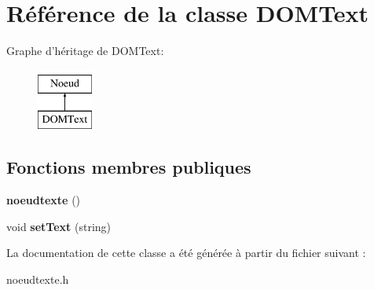 \hypertarget{classDOMText}{
\section{Référence de la classe DOMText}
\label{classDOMText}
}
Graphe d'héritage de DOMText:\begin{figure}[H]
\begin{center}
\leavevmode
\includegraphics[height=2.000000cm]{classDOMText}
\end{center}
\end{figure}
\subsection*{Fonctions membres publiques}
\begin{DoxyCompactItemize}
\item 
\hypertarget{classDOMText_a92469df02e0f2cd52726e3194e371fc7}{
{\bfseries noeudtexte} ()}
\label{classDOMText_a92469df02e0f2cd52726e3194e371fc7}

\item 
\hypertarget{classDOMText_ae256521159a51eed8ace13933af3aac5}{
void {\bfseries setText} (string)}
\label{classDOMText_ae256521159a51eed8ace13933af3aac5}

\end{DoxyCompactItemize}


La documentation de cette classe a été générée à partir du fichier suivant :\begin{DoxyCompactItemize}
\item 
noeudtexte.h\end{DoxyCompactItemize}
